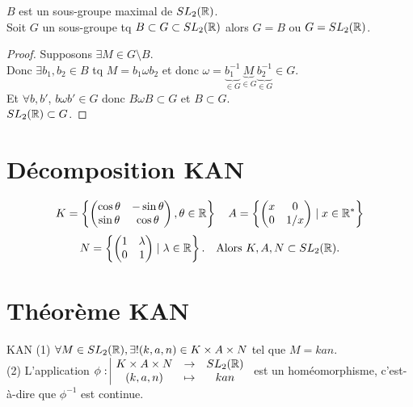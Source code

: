 \begin{corollaire}{}{}
    $B$ est un sous-groupe maximal de $SL_2(\mathbb{R})$. \\
    Soit $G$ un sous-groupe tq $B \subset G \subset SL_2(\mathbb{R})$ alors $G=B$ ou $G=SL_2(\mathbb{R})$.
\end{corollaire}

\begin{proof}
    Supposons $\exists M \in G \setminus B$. \\
    Donc $\exists b_1, b_2 \in B$ tq $M = b_1 \omega b_2$ et donc $\omega = \underbrace{b_1^{-1}}_{\in G} \underbrace{M}_{\in G} \underbrace{b_2^{-1}}_{\in G} \in G$. \\
    Et $\forall b, b'$, $b \omega b' \in G$ donc $B \omega B \subset G$ et $B \subset G$. \\
    $SL_2(\mathbb{R}) \subset G$.
\end{proof}

\section*{Décomposition KAN}

\[ K = \left\{ \begin{pmatrix} \cos \theta & -\sin \theta \\ \sin \theta & \cos \theta \end{pmatrix}, \theta \in \mathbb{R} \right\} \quad A = \left\{ \begin{pmatrix} x & 0 \\ 0 & 1/x \end{pmatrix} \mid x \in \mathbb{R}^* \right\} \]
\[ N = \left\{ \begin{pmatrix} 1 & \lambda \\ 0 & 1 \end{pmatrix} \mid \lambda \in \mathbb{R} \right\}. \quad \text{Alors } K, A, N \subset SL_2(\mathbb{R}). \]

\section*{Théorème KAN}

\begin{theoreme}{KAN}{}
     (1) $\forall M \in SL_2(\mathbb{R}), \exists! (k, a, n) \in K \times A \times N$ tel que $M = kan$. \\
    
     (2) L'application 
    $\phi: \space \begin{array}{|ccc} \displaystyle K \times A \times N & \to & \displaystyle SL_2(\mathbb{R}) \\ \displaystyle (k, a, n) & \mapsto & \displaystyle kan \end{array}$
    est un homéomorphisme, c'est-à-dire que $\phi^{-1}$ est continue.
\end{theoreme}

